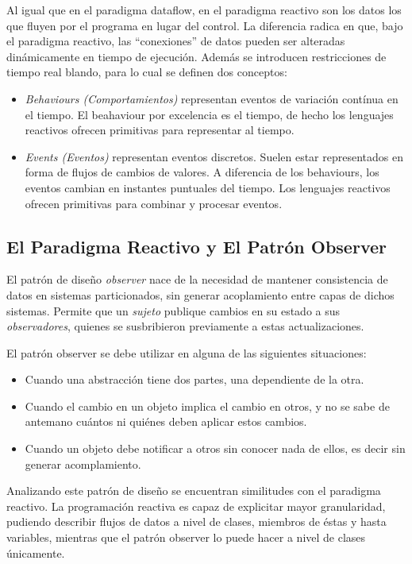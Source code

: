 Al igual que en el paradigma dataflow, en el paradigma reactivo son los datos
los que fluyen por el programa en lugar del control. La diferencia radica en
que, bajo el paradigma reactivo, las ``conexiones'' de datos pueden ser
alteradas dinámicamente en tiempo de ejecución.
Además se introducen restricciones de tiempo real blando, para lo cual se
definen dos conceptos:
\begin{itemize}
  \item \textit{Behaviours (Comportamientos)} representan eventos de variación
  contínua en el tiempo. El beahaviour por excelencia es el tiempo, de hecho los
  lenguajes reactivos ofrecen primitivas para representar al tiempo.
  \item \textit{Events (Eventos)} representan eventos discretos. Suelen estar
  representados en forma de flujos de cambios de valores. A diferencia de los
  behaviours, los eventos cambian en instantes puntuales del tiempo. Los
  lenguajes reactivos ofrecen primitivas para combinar y procesar eventos.
\end{itemize}
\cite{Bainomugisha:2013:SRP:2501654.2501666}

\subsection*{El Paradigma Reactivo y El Patrón Observer}

El patrón de diseño \textit{observer} \cite{Gamma:1995:DPE:186897} nace de la
necesidad de mantener consistencia de datos en sistemas particionados, sin generar
acoplamiento entre capas de dichos sistemas.
Permite que un \textit{sujeto} publique cambios en su estado a sus
\textit{observadores}, quienes se susbribieron previamente a estas
actualizaciones.

El patrón observer se debe utilizar en alguna de las siguientes situaciones:
\begin{itemize}
  \item Cuando una abstracción tiene dos partes, una dependiente de la otra.
  \item Cuando el cambio en un objeto implica el cambio en otros, y no se sabe
  de antemano cuántos ni quiénes deben aplicar estos cambios.
  \item Cuando un objeto debe notificar a otros sin conocer nada de ellos, es
  decir sin generar acomplamiento.
\end{itemize}
\cite{Gamma:1995:DPE:186897}

Analizando este patrón de diseño se encuentran similitudes con el paradigma
reactivo.
La programación reactiva es capaz de explicitar mayor granularidad, pudiendo
describir flujos de datos a nivel de clases, miembros de éstas y hasta
variables, mientras que el patrón observer lo puede hacer a nivel de clases
únicamente.


